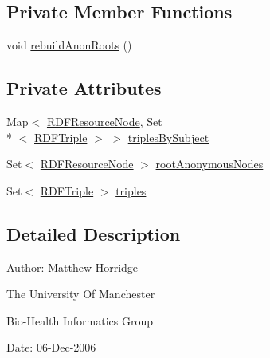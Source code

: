 \subsection*{Private Member Functions}
\begin{DoxyCompactItemize}
\item 
void \hyperlink{classorg_1_1coode_1_1owlapi_1_1rdf_1_1model_1_1_r_d_f_graph_a85e3cd1961f0b9f4661a2cf4e971bc7e}{rebuild\-Anon\-Roots} ()
\end{DoxyCompactItemize}
\subsection*{Private Attributes}
\begin{DoxyCompactItemize}
\item 
Map$<$ \hyperlink{classorg_1_1coode_1_1owlapi_1_1rdf_1_1model_1_1_r_d_f_resource_node}{R\-D\-F\-Resource\-Node}, Set\\*
$<$ \hyperlink{classorg_1_1coode_1_1owlapi_1_1rdf_1_1model_1_1_r_d_f_triple}{R\-D\-F\-Triple} $>$ $>$ \hyperlink{classorg_1_1coode_1_1owlapi_1_1rdf_1_1model_1_1_r_d_f_graph_a944a9001d484802a199abe0d0a6cb759}{triples\-By\-Subject}
\item 
Set$<$ \hyperlink{classorg_1_1coode_1_1owlapi_1_1rdf_1_1model_1_1_r_d_f_resource_node}{R\-D\-F\-Resource\-Node} $>$ \hyperlink{classorg_1_1coode_1_1owlapi_1_1rdf_1_1model_1_1_r_d_f_graph_afebf192f3ea9b68c2154cbf98547924b}{root\-Anonymous\-Nodes}
\item 
Set$<$ \hyperlink{classorg_1_1coode_1_1owlapi_1_1rdf_1_1model_1_1_r_d_f_triple}{R\-D\-F\-Triple} $>$ \hyperlink{classorg_1_1coode_1_1owlapi_1_1rdf_1_1model_1_1_r_d_f_graph_ab1d1c7ed6b147763e8b2cd3b50b78459}{triples}
\end{DoxyCompactItemize}


\subsection{Detailed Description}
Author\-: Matthew Horridge\par
 The University Of Manchester\par
 Bio-\/\-Health Informatics Group\par
 Date\-: 06-\/\-Dec-\/2006\par
\par
 

